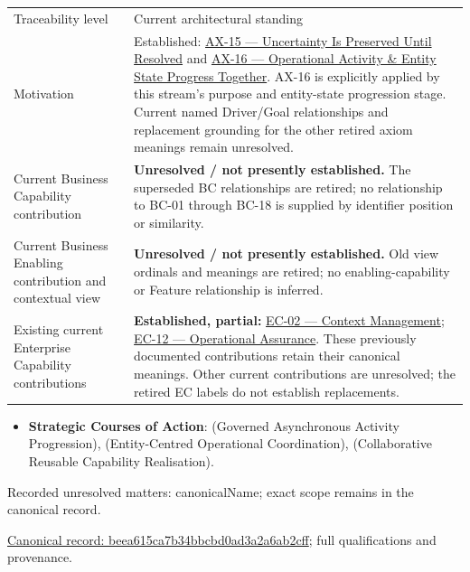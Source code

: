 \begin{longtable}{>{\raggedright\arraybackslash}p{}>{\raggedright\arraybackslash}p{}}
Traceability level & Current architectural standing \\
Motivation & Established: \hyperref[element:ef8abbaec37e4890ad78b9f263e67906]{AX-15 — Uncertainty Is Preserved Until Resolved} and \hyperref[element:de7e90f46127455a9ec9ad3b9b48ba54]{AX-16 — Operational Activity \& Entity State Progress Together}. AX-16 is explicitly applied by this stream’s purpose and entity-state progression stage. Current named Driver/Goal relationships and replacement grounding for the other retired axiom meanings remain unresolved. \\
Current Business Capability contribution & \textbf{Unresolved / not presently established.} The superseded BC relationships are retired; no relationship to BC-01 through BC-18 is supplied by identifier position or similarity. \\
Current Business Enabling contribution and contextual view & \textbf{Unresolved / not presently established.} Old view ordinals and meanings are retired; no enabling-capability or Feature relationship is inferred. \\
Existing current Enterprise Capability contributions & \textbf{Established, partial:} \href{\detokenize{../../../../../../../../docs/markdown/02-strategy/capabilities/enterprise-capabilities.md#ec-02-context-management}}{EC-02 — Context Management}; \href{\detokenize{../../../../../../../../docs/markdown/02-strategy/capabilities/enterprise-capabilities.md#ec-12-operational-assurance}}{EC-12 — Operational Assurance}. These previously documented contributions retain their canonical meanings. Other current contributions are unresolved; the retired EC labels do not establish replacements. \\
\end{longtable}


\begin{itemize}


\item \textbf{Strategic Courses of Action}: \texttt{} (Governed Asynchronous Activity Progression), \texttt{} (Entity-Centred Operational Coordination), \texttt{} (Collaborative Reusable Capability Realisation).

\end{itemize}

{\small Recorded unresolved matters: canonicalName; exact scope remains in the canonical record.}\par
{\footnotesize \href{../../../../../../../continuum/strategy/value-stream/beea615ca7b34bbcbd0ad3a2a6ab2cff.md}{Canonical record: beea615ca7b34bbcbd0ad3a2a6ab2cff}; full qualifications and provenance.}\par
